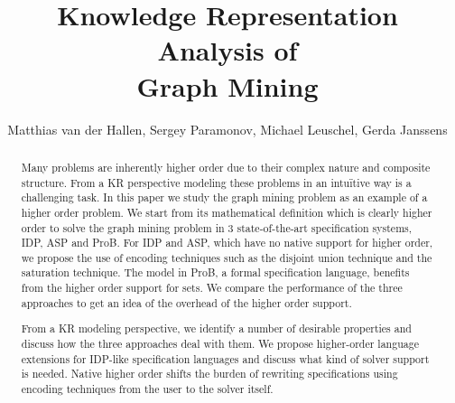 \documentclass{new_tlp}
\author[]{Matthias van der Hallen, Sergey Paramonov, Michael Leuschel, Gerda Janssens}
\title{Knowledge Representation Analysis of\\ Graph Mining}
\begin{document}
\maketitle
\begin{abstract}
Many problems are inherently higher order due to their complex nature and composite structure.
From a KR perspective modeling these problems in an intu\"itive way is a challenging task.
In this paper we study the graph mining problem as an example of a higher order problem.
We start from its mathematical definition which is clearly higher
order to solve the graph mining problem in 3 state-of-the-art specification
systems, IDP, ASP and ProB.
For IDP and ASP, which have no
native support for higher order, we propose the use of encoding
techniques such as the disjoint union technique and the saturation technique.
The model in ProB, a formal specification language, benefits
from the higher order support for sets.
We compare the performance of the three approaches to get an idea of
the overhead of the higher order support.

From a KR modeling perspective, we identify a number of desirable
properties and discuss how the three approaches deal with them.
We propose higher-order language extensions for IDP-like
specification languages
and  discuss what kind of solver support is needed.
Native higher order shifts the burden of rewriting specifications using encoding techniques from the user to the solver itself.


\end{abstract}


%




%


{\tiny
}


%
\end{document}
